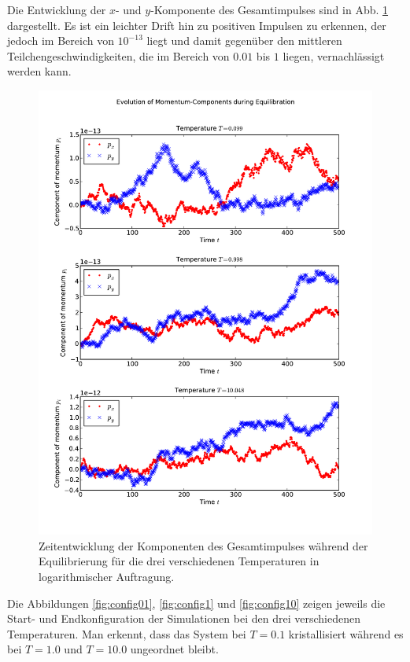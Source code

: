 \documentclass[11pt,a4paper]{article}
\begin{document}
Die Entwicklung der $x$- und $y$-Komponente des Gesamtimpulses sind in Abb. \ref{fig:momenta} dargestellt. Es ist ein leichter Drift hin zu positiven Impulsen zu erkennen, der jedoch im Bereich von $10^{-13}$ liegt und damit gegenüber den mittleren Teilchengeschwindigkeiten, die im Bereich von $0.01$ bis $1$ liegen, vernachlässigt werden kann.
\begin{figure}[tbp]
\hspace*{-3em}\vspace*{-1.5cm}  \includegraphics[width=17cm]{../momenta}
 \caption{Zeitentwicklung der Komponenten des Gesamtimpulses während der Equilibrierung für die drei verschiedenen Temperaturen in logarithmischer Auftragung.}\label{fig:momenta}
\end{figure}

Die Abbildungen \ref{fig:config01}, \ref{fig:config1} und \ref{fig:config10} zeigen jeweils die Start- und Endkonfiguration der Simulationen bei den drei verschiedenen Temperaturen. Man erkennt, dass das System bei $T=0.1$ kristallisiert während es bei $T=1.0$ und $T=10.0$ ungeordnet bleibt.
\end{document}
